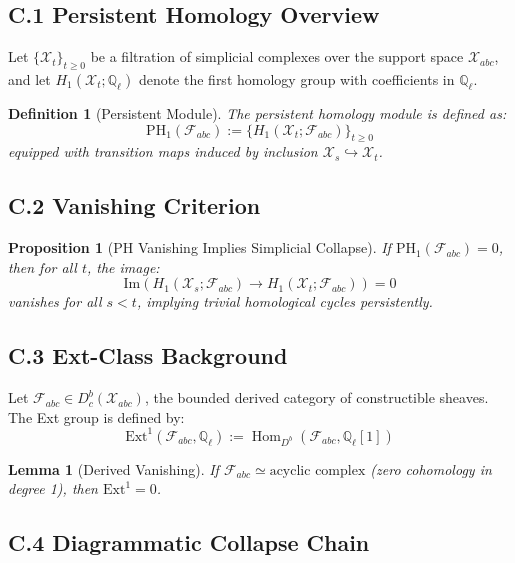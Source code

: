 \documentclass[11pt]{article}
\newtheorem{definition}[theorem]{Definition}
\newtheorem{lemma}[theorem]{Lemma}
\newtheorem{proposition}[theorem]{Proposition}
\begin{document}
\subsection*{C.1 Persistent Homology Overview}

Let \( \{ \mathcal{X}_t \}_{t \geq 0} \) be a filtration of simplicial complexes over the support space \( \mathcal{X}_{abc} \),  
and let \( H_1(\mathcal{X}_t; \mathbb{Q}_\ell) \) denote the first homology group with coefficients in \( \mathbb{Q}_\ell \).

\begin{definition}[Persistent Module]
The persistent homology module is defined as:
\[
\mathrm{PH}_1(\mathcal{F}_{abc}) := \{ H_1(\mathcal{X}_t; \mathcal{F}_{abc}) \}_{t \geq 0}
\]
equipped with transition maps induced by inclusion \( \mathcal{X}_s \hookrightarrow \mathcal{X}_t \).
\end{definition}

\subsection*{C.2 Vanishing Criterion}

\begin{proposition}[PH Vanishing Implies Simplicial Collapse]
If \( \mathrm{PH}_1(\mathcal{F}_{abc}) = 0 \), then for all \( t \), the image:
\[
\mathrm{Im} \left( H_1(\mathcal{X}_s; \mathcal{F}_{abc}) \to H_1(\mathcal{X}_t; \mathcal{F}_{abc}) \right) = 0
\]
vanishes for all \( s < t \), implying trivial homological cycles persistently.
\end{proposition}

\subsection*{C.3 Ext-Class Background}

Let \( \mathcal{F}_{abc} \in D^b_c(\mathcal{X}_{abc}) \), the bounded derived category of constructible sheaves.  
The Ext group is defined by:
\[
\mathrm{Ext}^1(\mathcal{F}_{abc}, \mathbb{Q}_\ell) := \operatorname{Hom}_{D^b}(\mathcal{F}_{abc}, \mathbb{Q}_\ell[1])
\]

\begin{lemma}[Derived Vanishing]
If \( \mathcal{F}_{abc} \simeq \text{acyclic complex} \) (zero cohomology in degree 1), then \( \mathrm{Ext}^1 = 0 \).
\end{lemma}

\subsection*{C.4 Diagrammatic Collapse Chain}
\end{document}

